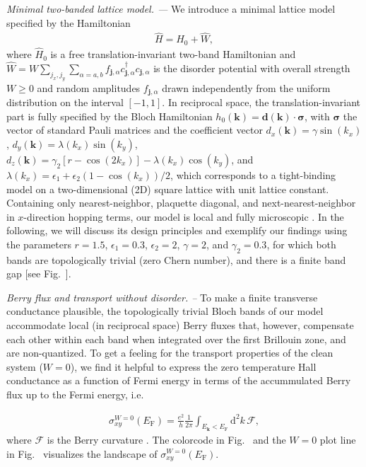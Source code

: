 \documentclass[aps,prl,amsmath,amssymb,twocolumn, superscriptaddress]{revtex4-2}
\begin{document}
{\it Minimal two-banded lattice model. ---}
We introduce a minimal lattice model specified by the Hamiltonian 
\begin{align}
\hat H = \hat H_0 + \hat W,
\label{eq:ham}
\end{align}
where $\hat H_0$ is a free translation-invariant two-band Hamiltonian and $\hat W = W\sum_{j_x, j_y} \sum_{\alpha = a,b} f_{\bm j, \alpha} c_{\bm j, \alpha}^\dagger c_{\bm j, \alpha}$ is the disorder potential with overall strength $W \ge 0$ and random amplitudes $f_{\bm j, \alpha}$ drawn independently from the uniform distribution on the interval $[-1,1]$. In reciprocal space, the translation-invariant part is fully specified by the Bloch Hamiltonian $h_0(\bm k ) = \bm d(\bm k) \cdot \bm \sigma$, with $\bm \sigma$ the vector of standard Pauli matrices and the coefficient vector $d_x(\bm k) = \gamma \sin(k_x)$, $d_y(\bm k) = \lambda(k_x) \sin(k_y)$, $d_z(\bm k) = \gamma_2[r - \cos(2 k_x)] - \lambda(k_x) \cos(k_y)$, and $\lambda(k_x) =  \epsilon_1 + \epsilon_2 (1 - \cos(k_x))/2 $, which corresponds to a tight-binding model on a two-dimensional (2D) square lattice with unit lattice constant. Containing only nearest-neighbor, plaquette diagonal, and next-nearest-neighbor in $x$-direction hopping terms, our model is local and fully microscopic \cite{Supplemental}. In the following, we will discuss its design principles and exemplify our findings using the parameters $r = 1.5$, $\epsilon_1 = 0.3$, $\epsilon_2 = 2$, $\gamma  =2$, and $\gamma_2 = 0.3$, for which both bands are topologically trivial (zero Chern number), and there is a finite band gap [see Fig.~]. 


{\it Berry flux and transport without disorder. --} To make a finite transverse conductance plausible, the topologically trivial Bloch bands of our model accommodate local (in reciprocal space) Berry fluxes that, however, compensate each other within each band when integrated over the first Brillouin zone, and are non-quantized. To get a feeling for the transport properties of the clean system ($W=0$), we find it helpful to express the zero temperature Hall conductance as a function of Fermi energy in terms of the accummulated Berry flux up to the Fermi energy, i.e.

\begin{align}
\sigma_{xy}^{W=0}(E_\mathrm{F}) = \frac{e^2}{h} \frac{1}{2\pi}\int_{E_{\bm k}<E_\mathrm{F}}\mathrm{d}^2k \,  \mathcal F, \label{Eqn:accumulated_flux}
\end{align}
where $\mathcal F$ is the Berry curvature \cite{Supplemental}. The colorcode in Fig.~ and the $W=0$ plot line in Fig.~  visualizes the landscape of $\sigma_{xy}^{W=0}(E_\mathrm{F})$.
\end{document}
